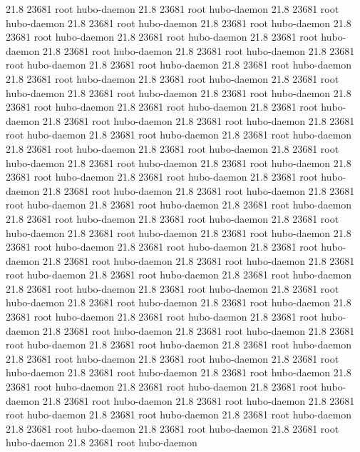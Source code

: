 21.8 23681 root     hubo-daemon
21.8 23681 root     hubo-daemon
21.8 23681 root     hubo-daemon
21.8 23681 root     hubo-daemon
21.8 23681 root     hubo-daemon
21.8 23681 root     hubo-daemon
21.8 23681 root     hubo-daemon
21.8 23681 root     hubo-daemon
21.8 23681 root     hubo-daemon
21.8 23681 root     hubo-daemon
21.8 23681 root     hubo-daemon
21.8 23681 root     hubo-daemon
21.8 23681 root     hubo-daemon
21.8 23681 root     hubo-daemon
21.8 23681 root     hubo-daemon
21.8 23681 root     hubo-daemon
21.8 23681 root     hubo-daemon
21.8 23681 root     hubo-daemon
21.8 23681 root     hubo-daemon
21.8 23681 root     hubo-daemon
21.8 23681 root     hubo-daemon
21.8 23681 root     hubo-daemon
21.8 23681 root     hubo-daemon
21.8 23681 root     hubo-daemon
21.8 23681 root     hubo-daemon
21.8 23681 root     hubo-daemon
21.8 23681 root     hubo-daemon
21.8 23681 root     hubo-daemon
21.8 23681 root     hubo-daemon
21.8 23681 root     hubo-daemon
21.8 23681 root     hubo-daemon
21.8 23681 root     hubo-daemon
21.8 23681 root     hubo-daemon
21.8 23681 root     hubo-daemon
21.8 23681 root     hubo-daemon
21.8 23681 root     hubo-daemon
21.8 23681 root     hubo-daemon
21.8 23681 root     hubo-daemon
21.8 23681 root     hubo-daemon
21.8 23681 root     hubo-daemon
21.8 23681 root     hubo-daemon
21.8 23681 root     hubo-daemon
21.8 23681 root     hubo-daemon
21.8 23681 root     hubo-daemon
21.8 23681 root     hubo-daemon
21.8 23681 root     hubo-daemon
21.8 23681 root     hubo-daemon
21.8 23681 root     hubo-daemon
21.8 23681 root     hubo-daemon
21.8 23681 root     hubo-daemon
21.8 23681 root     hubo-daemon
21.8 23681 root     hubo-daemon
21.8 23681 root     hubo-daemon
21.8 23681 root     hubo-daemon
21.8 23681 root     hubo-daemon
21.8 23681 root     hubo-daemon
21.8 23681 root     hubo-daemon
21.8 23681 root     hubo-daemon
21.8 23681 root     hubo-daemon
21.8 23681 root     hubo-daemon
21.8 23681 root     hubo-daemon
21.8 23681 root     hubo-daemon
21.8 23681 root     hubo-daemon
21.8 23681 root     hubo-daemon
21.8 23681 root     hubo-daemon
21.8 23681 root     hubo-daemon
21.8 23681 root     hubo-daemon
21.8 23681 root     hubo-daemon
21.8 23681 root     hubo-daemon
21.8 23681 root     hubo-daemon
21.8 23681 root     hubo-daemon
21.8 23681 root     hubo-daemon
21.8 23681 root     hubo-daemon
21.8 23681 root     hubo-daemon
21.8 23681 root     hubo-daemon
21.8 23681 root     hubo-daemon
21.8 23681 root     hubo-daemon
21.8 23681 root     hubo-daemon
21.8 23681 root     hubo-daemon
21.8 23681 root     hubo-daemon
21.8 23681 root     hubo-daemon
21.8 23681 root     hubo-daemon
